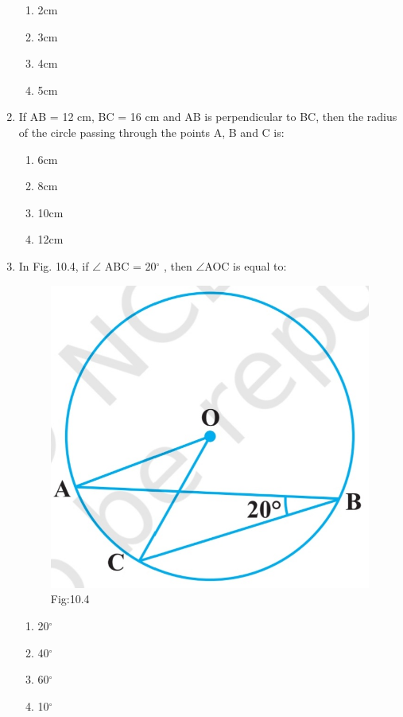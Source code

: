 \documentclass{article}
\begin{document}
\begin{enumerate}
\begin{enumerate}
\item 2cm
\item 3cm
\item 4cm
\item 5cm
\end{enumerate}
\item If AB = 12 cm, BC = 16 cm and AB is perpendicular to BC, then the radius of the circle passing through the points A, B and C is:
\begin{enumerate}
\item 6cm
\item 8cm
\item 10cm
\item 12cm
\end{enumerate}
\item In Fig. 10.4, if $\angle$ ABC = 20$^{\circ}$ , then $\angle$AOC is equal to: 
\begin{figure}[H]
\centering
\includegraphics[width=\columnwidth]{Figs/10.4.jpg}
\caption*{Fig:10.4}
\end{figure}
\begin{enumerate}
\item 20$^{\circ}$
\item 40$^{\circ}$
\item 60$^{\circ}$
\item 10$^{\circ}$
\end{enumerate}

\end{enumerate}
\end{document}
